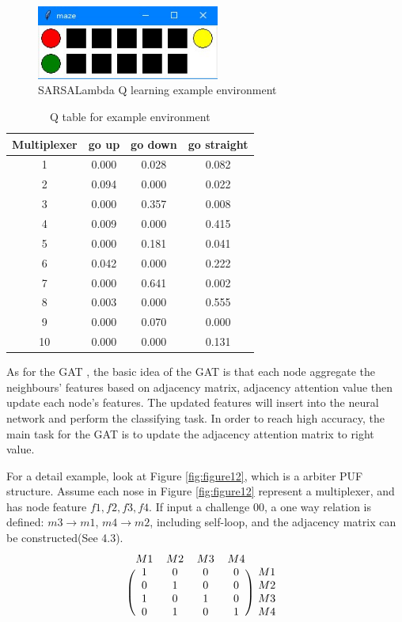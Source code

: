 \begin{figure}[htp]
    \centering
    \includegraphics[width=6cm]{figures/figure11.jpg}
    \caption{SARSALambda Q learning example environment}
    \label{fig:figure11}
    \end{figure}

\begin{table}[ht]
    \center
    \begin{tabular}{c|ccc}
    Multiplexer & go up & go down & go straight\\
    \hline
    1 & 0.000 & 0.028 & 0.082\\
    2 & 0.094 & 0.000 & 0.022\\
    3 & 0.000 & 0.357 & 0.008\\
    4 & 0.009 & 0.000 & 0.415\\
    5 & 0.000 & 0.181 & 0.041\\
    6 & 0.042 & 0.000 & 0.222\\
    7 & 0.000 & 0.641 & 0.002\\
    8 & 0.003 & 0.000 & 0.555\\
    9 & 0.000 & 0.070 & 0.000\\
    10 & 0.000 & 0.000 & 0.131\\
    \end{tabular}
    \caption{Q table for example environment}
    \label{tab:table1}
    \end{table}

As for the GAT \cite{Reference10}, the basic idea of the GAT is that each node aggregate the neighbours’ features based on adjacency matrix, adjacency attention value then update each node's features. 
The updated features will insert into the neural network and perform the classifying task. In order to reach high accuracy, the main task for the GAT is to update the adjacency attention matrix to
right value.

For a detail example, look at Figure \ref{fig:figure12}, which is a arbiter PUF structure. Assume each nose in Figure \ref{fig:figure12} represent a multiplexer, and has node feature $f1,f2,f3,f4$. If input a 
challenge 00, a one way relation is defined: 
$m3 \rightarrow m1$, $m4 \rightarrow m2$, including self-loop, and the adjacency matrix can be constructed(See 4.3). 
\begin{equation}
    \begin{blockarray}{ccccc}
    M1 & M2 & M3 & M4\\
    \begin{block}{(cccc)c}
        1 & 0 & 0 & 0 & M1\\
        0 & 1 & 0 & 0 & M2\\
        1 & 0 & 1 & 0 & M3\\
        0 & 1 & 0 & 1 & M4\\
    \end{block}
    \end{blockarray}
    \label{matrix}
\end{equation}

